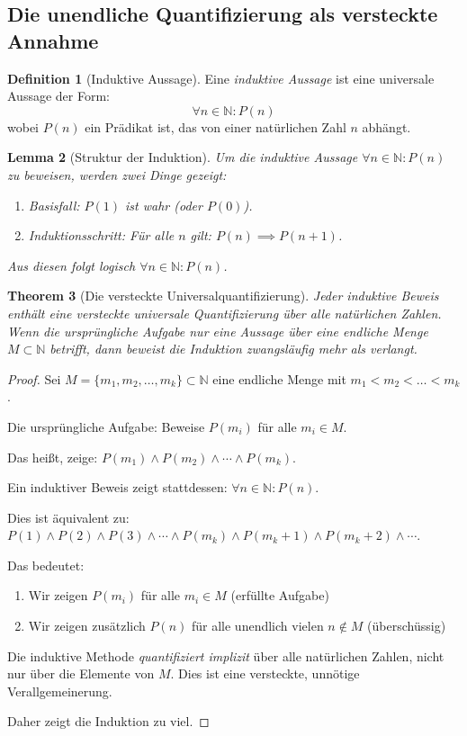 \documentclass[12pt, a4paper]{article}
\newtheorem{theorem}{Theorem}[section]
\newtheorem{lemma}[theorem]{Lemma}
\theoremstyle{definition}
\newtheorem{definition}[theorem]{Definition}
\theoremstyle{remark}
\newcommand{\N}{\mathbb{N}}
\begin{document}
\subsection{Die unendliche Quantifizierung als versteckte Annahme}
\label{subsec:unendliche_quantifizierung}

\begin{definition}[Induktive Aussage]
\label{def:induktive_aussage}
Eine \emph{induktive Aussage} ist eine universale Aussage der Form:
\[
  \forall n \in \N: P(n)
\]
wobei $P(n)$ ein Prädikat ist, das von einer natürlichen Zahl $n$ abhängt.
\end{definition}

\begin{lemma}[Struktur der Induktion]
\label{lem:struktur_induktion}
Um die induktive Aussage $\forall n \in \N: P(n)$ zu beweisen, werden zwei Dinge gezeigt:
\begin{enumerate}[label=(\alph*)]
  \item \emph{Basisfall:} $P(1)$ ist wahr (oder $P(0)$).
  \item \emph{Induktionsschritt:} Für alle $n$ gilt: $P(n) \implies P(n+1)$.
\end{enumerate}

Aus diesen folgt logisch $\forall n \in \N: P(n)$.
\end{lemma}

\begin{theorem}[Die versteckte Universalquantifizierung]
\label{thm:versteckte_quantifizierung}
Jeder induktive Beweis enthält eine \emph{versteckte universale Quantifizierung über alle natürlichen Zahlen}. Wenn die ursprüngliche Aufgabe nur eine Aussage über eine \emph{endliche} Menge $M \subset \N$ betrifft, dann beweist die Induktion zwangsläufig \emph{mehr} als verlangt.
\end{theorem}

\begin{proof}
Sei $M = \{m_1, m_2, \ldots, m_k\} \subset \N$ eine endliche Menge mit $m_1 < m_2 < \ldots < m_k$.

Die ursprüngliche Aufgabe: Beweise $P(m_i)$ für alle $m_i \in M$.

Das heißt, zeige: $P(m_1) \land P(m_2) \land \cdots \land P(m_k)$.

Ein induktiver Beweis zeigt stattdessen: $\forall n \in \N: P(n)$.

Dies ist äquivalent zu: $P(1) \land P(2) \land P(3) \land \cdots \land P(m_k) \land P(m_k+1) \land P(m_k+2) \land \cdots$.

Das bedeutet:
\begin{enumerate}[label=(\roman*)]
  \item Wir zeigen $P(m_i)$ für alle $m_i \in M$ (erfüllte Aufgabe)
  \item Wir zeigen zusätzlich $P(n)$ für alle unendlich vielen $n \notin M$ (überschüssig)
\end{enumerate}

Die induktive Methode \emph{quantifiziert implizit} über alle natürlichen Zahlen, nicht nur über die Elemente von $M$. Dies ist eine versteckte, unnötige Verallgemeinerung.

Daher zeigt die Induktion zu viel.
\end{proof}
\end{document}
